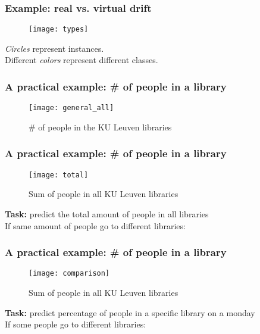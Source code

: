 \begin{frame}
\frametitle{Example: real vs. virtual drift}
\begin{figure}
	\texttt{[image: types]}
\end{figure}
\textit{Circles} represent instances.\\
Different \textit{colors} represent different classes.

\end{frame}

\begin{frame}
\frametitle{A practical example: \# of people in a library}
\begin{figure}
	\texttt{[image: general\_all]}
	\caption	{\# of people in the KU Leuven libraries}
\end{figure}

\end{frame}

\begin{frame}
\frametitle{A practical example: \# of people in a library}
\begin{figure}
	\texttt{[image: total]}
	\caption	{Sum of people in all KU Leuven libraries}
\end{figure}
\textbf{Task:} predict the total amount of people in all libraries\\
If same amount of people go to different libraries: 
\end{frame}
\begin{frame}
\frametitle{A practical example: \# of people in a library}
\begin{figure}
	\texttt{[image: comparison]}
	\caption	{Sum of people in all KU Leuven libraries}
\end{figure}
\textbf{Task:} predict percentage of people in a specific library on a monday\\
If some people go to different libraries: 
\end{frame}

